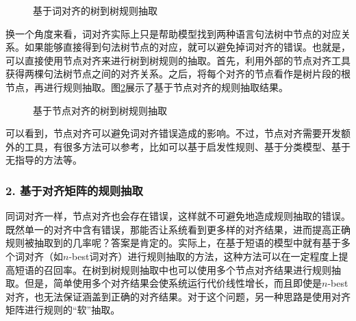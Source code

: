 \begin{figure}[htp]
\centering

\caption{基于词对齐的树到树规则抽取}
\label{fig:8-34}
\end{figure}

\parinterval 换一个角度来看，词对齐实际上只是帮助模型找到两种语言句法树中节点的对应关系。如果能够直接得到句法树节点的对应，就可以避免掉词对齐的错误。也就是，可以直接使用节点对齐来进行树到树规则的抽取。首先，利用外部的节点对齐工具获得两棵句法树节点之间的对齐关系。之后，将每个对齐的节点看作是树片段的根节点，再进行规则抽取。图\ref{fig:8-35}展示了基于节点对齐的规则抽取结果。

\begin{figure}[htb]
\centering

\caption{基于节点对齐的树到树规则抽取}
\label{fig:8-35}
\end{figure}

\parinterval 可以看到，节点对齐可以避免词对齐错误造成的影响。不过，节点对齐需要开发额外的工具，有很多方法可以参考，比如可以基于启发性规则、基于分类模型、基于无指导的方法等。


\subsubsection{2. 基于对齐矩阵的规则抽取}

\parinterval 同词对齐一样，节点对齐也会存在错误，这样就不可避免地造成规则抽取的错误。既然单一的对齐中含有错误，那能否让系统看到更多样的对齐结果，进而提高正确规则被抽取到的几率呢？答案是肯定的。实际上，在基于短语的模型中就有基于多个词对齐（如$n$-best词对齐）进行规则抽取的方法，这种方法可以在一定程度上提高短语的召回率。在树到树规则抽取中也可以使用多个节点对齐结果进行规则抽取。但是，简单使用多个对齐结果会使系统运行代价线性增长，而且即使是$n$-best对齐，也无法保证涵盖到正确的对齐结果。对于这个问题，另一种思路是使用对齐矩阵进行规则的“软”抽取。


